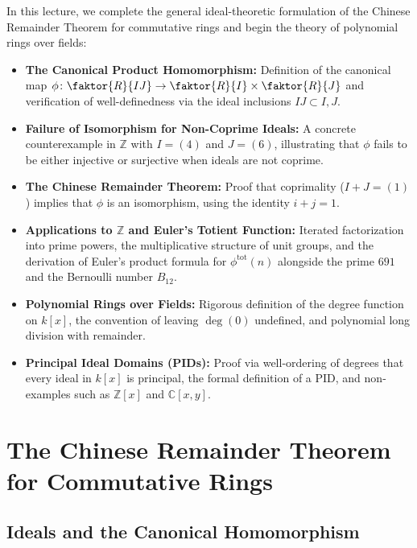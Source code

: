 \begin{overview}
In this lecture, we complete the general ideal-theoretic formulation of the Chinese Remainder Theorem for commutative rings and begin the theory of polynomial rings over fields:
\begin{itemize}
    \item \textbf{The Canonical Product Homomorphism:} Definition of the canonical map $\phi \colon \faktor{R}{IJ} \to \faktor{R}{I} \times \faktor{R}{J}$ and verification of well-definedness via the ideal inclusions $IJ \subset I, J$.
    \item \textbf{Failure of Isomorphism for Non-Coprime Ideals:} A concrete counterexample in $\mathbb{Z}$ with $I = (4)$ and $J = (6)$, illustrating that $\phi$ fails to be either injective or surjective when ideals are not coprime.
    \item \textbf{The Chinese Remainder Theorem:} Proof that coprimality ($I + J = (1)$) implies that $\phi$ is an isomorphism, using the identity $i + j = 1$.
    \item \textbf{Applications to $\mathbb{Z}$ and Euler's Totient Function:} Iterated factorization into prime powers, the multiplicative structure of unit groups, and the derivation of Euler's product formula for $\phi^{\text{tot}}(n)$ alongside the prime $691$ and the Bernoulli number $B_{12}$.
    \item \textbf{Polynomial Rings over Fields:} Rigorous definition of the degree function on $k[x]$, the convention of leaving $\deg(0)$ undefined, and polynomial long division with remainder.
    \item \textbf{Principal Ideal Domains (PIDs):} Proof via well-ordering of degrees that every ideal in $k[x]$ is principal, the formal definition of a PID, and non-examples such as $\mathbb{Z}[x]$ and $\mathbb{C}[x, y]$.
\end{itemize}
\end{overview}

\section{The Chinese Remainder Theorem for Commutative Rings}

\subsection{Ideals and the Canonical Homomorphism}

